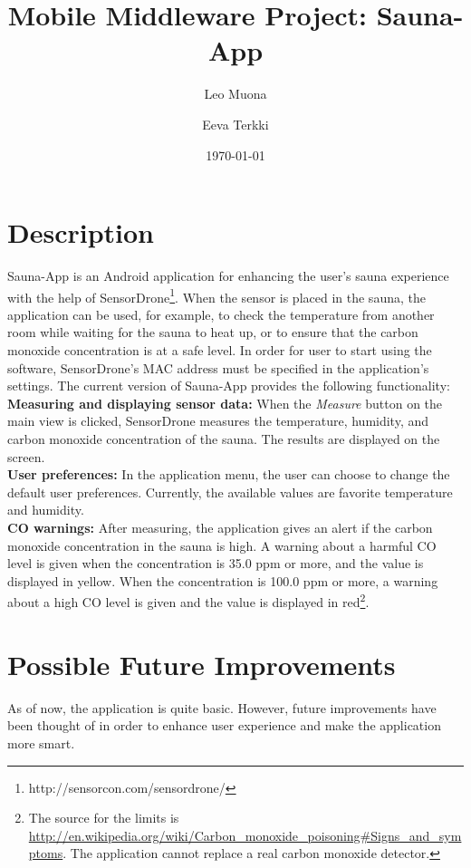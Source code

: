 \documentclass[11pt]{article}
\title{\textbf{Mobile Middleware Project: Sauna-App}}
\author{Leo Muona \and
		Eeva Terkki}
\date{\today}
\begin{document}
\maketitle
\thispagestyle{empty}

\section{Description}

Sauna-App is an Android application for enhancing the user's sauna experience with the help of SensorDrone\footnote{http://sensorcon.com/sensordrone/}. When the sensor is placed in the sauna, the application can be used, for example, to check the temperature from another room while waiting for the sauna to heat up, or to ensure that the carbon monoxide concentration is at a safe level. In order for user to start using the software, SensorDrone's MAC address must be specified in the application's settings. The current version of Sauna-App provides the following functionality:\\

\noindent\textbf{Measuring and displaying sensor data:} When the \textit{Measure} button on the main view is clicked, SensorDrone measures the temperature, humidity, and carbon monoxide concentration of the sauna. The results are displayed on the screen. \\

\noindent\textbf{User preferences:} In the application menu, the user can choose to change the default user preferences. Currently, the available values are favorite temperature and humidity.  \\

\noindent\textbf{CO warnings:} After measuring, the application gives an alert if the carbon monoxide concentration in the sauna is high. A warning about a harmful CO level is given when the concentration is 35.0 ppm or more, and the value is displayed in yellow. When the concentration is 100.0 ppm or more, a warning about a high CO level is given and the value is displayed in red\footnote{The source for the limits is \url{http://en.wikipedia.org/wiki/Carbon_monoxide_poisoning\#Signs_and_symptoms}. The application cannot replace a real carbon monoxide detector.}.

\section{Possible Future Improvements}

As of now, the application is quite basic. However, future improvements have been thought of in order to enhance user experience and make the application more smart. \\
\end{document}
